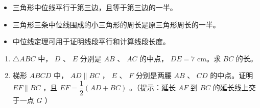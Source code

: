 \begin{keytakeaway}


\begin{itemize}
  \item 三角形中位线平行于第三边，且等于第三边的一半。
  \item 三角形三条中位线围成的小三角形的周长是原三角形周长的一半。
  \item 中位线定理可用于证明线段平行和计算线段长度。
\end{itemize}


\end{keytakeaway}

\begin{practice}


\begin{enumerate}
  \item $\triangle ABC$ 中， $D$ 、 $E$ 分别是 $AB$ 、 $AC$ 的中点， $DE = 7$ cm。求 $BC$ 的长。
  \item 梯形 $ABCD$ 中， $AD \parallel BC$ ， $E$ 、 $F$ 分别是两腰 $AB$ 、 $CD$ 的中点。证明 $EF \parallel BC$ ，且 $EF = \dfrac{1}{2}(AD + BC)$ 。（提示：延长 $AF$ 到 $BC$ 的延长线上交于一点 $G$ ）
\end{enumerate}


\end{practice}




